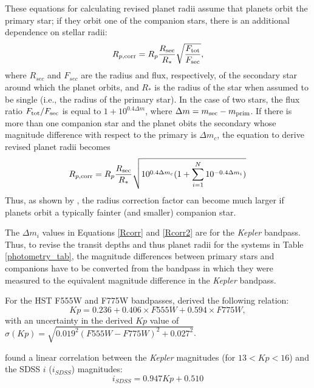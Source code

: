 \documentclass[twocolumn,appendixfloats]{aastex6}
\begin{document}
These equations for calculating revised planet radii assume that
planets orbit the primary star; if they orbit one of the companion stars,
there is an additional dependence on stellar radii:
\begin{equation}
R_{p, \rm corr} = R_p \frac{R_{\rm sec}}{R_{\ast}} 
\sqrt{\frac{F_{\rm tot}}{F_{\rm sec}}},
\end{equation} 
where $R_{sec}$ and $F_{sec}$ are the radius and flux, respectively, of
the secondary star around which the planet orbits, and $R_{\ast}$ is 
the radius of the star when assumed to be single (i.e., the radius of the
primary star). In the case of two stars, the flux ratio $F_{\rm tot}/F_{\rm sec}$ 
is equal to $1+10^{0.4 \Delta m}$, where $\Delta m = 
m_{\rm sec} - m_{\rm prim}$.
If there is more than one companion star and the planet obits the 
secondary whose magnitude difference with respect to the primary is
$\Delta m_c$, the equation to derive revised planet radii becomes
\begin{equation}
R_{p, \rm corr} = R_p \frac{R_{\rm sec}}{R_{\ast}}
\sqrt{10^{0.4 \Delta m_c} (1+ \sum_{i=1}^{N}{10^{-0.4\Delta m_i}})}   
\label{Rcorr2}
\end{equation} 
Thus, as shown by \citet{ciardi15}, the radius correction factor can
become much larger if planets orbit a typically fainter (and smaller) 
companion star.
 
The $\Delta m_i$ values in Equations \ref{Rcorr} and \ref{Rcorr2} 
are for the {\it Kepler} bandpass. Thus, to revise the transit depths 
and thus planet radii for the systems in Table \ref{photometry_tab}, 
the magnitude differences between primary stars and companions 
have to be converted from the bandpass in which they were measured 
to the equivalent magnitude difference in the {\it Kepler} bandpass. 

For the HST F555W and F775W bandpasses, \citet{cartier15} derived the
following relation:
\begin{equation}
Kp = 0.236 + 0.406 \times F555W + 0.594 \times F775W,
\end{equation} 
with an uncertainty in the derived $Kp$ value of $\sigma(Kp) = 
\sqrt{0.019^2(F555W-F775W)^2+0.027^2}$.
 
\citet{lillo-box14} found a linear correlation between the {\it Kepler} magnitudes
(for $13 < Kp < 16$) and the SDSS $i$ ($i_{SDSS}$) magnitudes:
\begin{equation}
i_{SDSS} = 0.947 Kp + 0.510
\end{equation}
\end{document}
